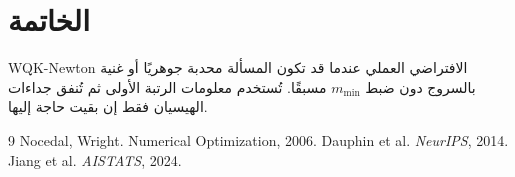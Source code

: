 ﻿\documentclass[12pt,a4paper]{article}
\begin{document}
\section{الخاتمة}
\textenglish{WQK-Newton} الافتراضي العملي عندما قد تكون المسألة محدبة
جوهريًا أو غنية بالسروج دون ضبط $m_{\min}$ مسبقًا. تُستخدم معلومات الرتبة
الأولى ثم تُنفق جداءات الهيسيان فقط إن بقيت حاجة إليها.

\begin{english}
\begin{thebibliography}{9}
 Nocedal, Wright. Numerical Optimization, 2006.
 Dauphin et al. \textit{NeurIPS}, 2014.
 Jiang et al. \textit{AISTATS}, 2024.
\end{thebibliography}
\end{english}
\end{document}
